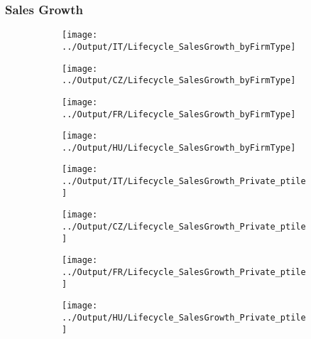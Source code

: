 \documentclass[12pt,notitlepage]{article}
\begin{document}
\subsubsection{Sales Growth}
\begin{figure}[!htpb]
\centering
\caption{Sales (Average)}
\begin{subfigure}{.49\textwidth}
    \centering
 \texttt{[image: ../Output/IT/Lifecycle\_SalesGrowth\_byFirmType]}
\end{subfigure}%
\begin{subfigure}{.49\textwidth}
    \centering
 \texttt{[image: ../Output/CZ/Lifecycle\_SalesGrowth\_byFirmType]}
\end{subfigure}
\begin{subfigure}{.49\textwidth}
    \centering
 \texttt{[image: ../Output/FR/Lifecycle\_SalesGrowth\_byFirmType]}
\end{subfigure}%
\begin{subfigure}{.49\textwidth}
    \centering
 \texttt{[image: ../Output/HU/Lifecycle\_SalesGrowth\_byFirmType]}
\end{subfigure}
\end{figure}
\pagebreak

\begin{figure}[!htpb]
\centering
\caption{Sales Growth (Percentile - Private)}
\begin{subfigure}{.49\textwidth}
    \centering
 \texttt{[image: ../Output/IT/Lifecycle\_SalesGrowth\_Private\_ptile]}
\end{subfigure}%
\begin{subfigure}{.49\textwidth}
    \centering
 \texttt{[image: ../Output/CZ/Lifecycle\_SalesGrowth\_Private\_ptile]}
\end{subfigure}
\begin{subfigure}{.49\textwidth}
    \centering
 \texttt{[image: ../Output/FR/Lifecycle\_SalesGrowth\_Private\_ptile]}
\end{subfigure}%
\begin{subfigure}{.49\textwidth}
    \centering
 \texttt{[image: ../Output/HU/Lifecycle\_SalesGrowth\_Private\_ptile]}
\end{subfigure}
\end{figure}
\pagebreak
\end{document}
